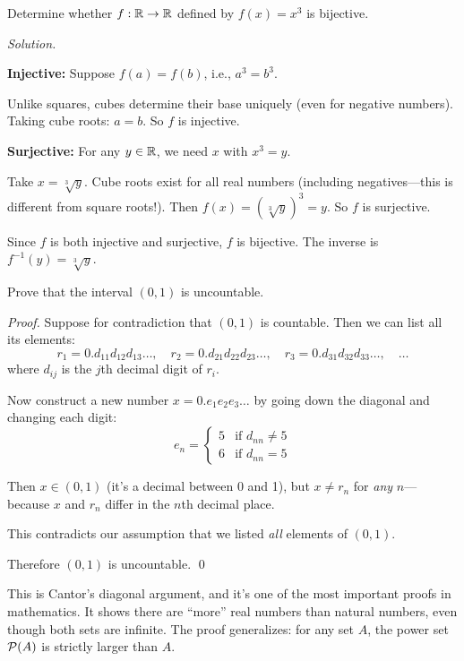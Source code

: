 \begin{example}
Determine whether $f: \mathbb{R} \to \mathbb{R}$ defined by $f(x) = x^3$ is bijective.

\emph{Solution.}

\textbf{Injective:} Suppose $f(a) = f(b)$, i.e., $a^3 = b^3$.

Unlike squares, cubes determine their base uniquely (even for negative numbers). Taking cube roots: $a = b$. So $f$ is injective.

\textbf{Surjective:} For any $y \in \mathbb{R}$, we need $x$ with $x^3 = y$.

Take $x = \sqrt[3]{y}$. Cube roots exist for all real numbers (including negatives---this is different from square roots!). Then $f(x) = (\sqrt[3]{y})^3 = y$. So $f$ is surjective.

Since $f$ is both injective and surjective, $f$ is bijective. The inverse is $f^{-1}(y) = \sqrt[3]{y}$.
\end{example}

\begin{example}
Prove that the interval $(0, 1)$ is uncountable.

\emph{Proof.} Suppose for contradiction that $(0, 1)$ is countable. Then we can list all its elements:
\[
r_1 = 0.d_{11}d_{12}d_{13}\ldots, \quad r_2 = 0.d_{21}d_{22}d_{23}\ldots, \quad r_3 = 0.d_{31}d_{32}d_{33}\ldots, \quad \ldots
\]
where $d_{ij}$ is the $j$th decimal digit of $r_i$.

Now construct a new number $x = 0.e_1e_2e_3\ldots$ by going down the diagonal and changing each digit:
\[
e_n = \begin{cases} 5 & \text{if } d_{nn} \neq 5 \\ 6 & \text{if } d_{nn} = 5 \end{cases}
\]

Then $x \in (0, 1)$ (it's a decimal between 0 and 1), but $x \neq r_n$ for \emph{any} $n$---because $x$ and $r_n$ differ in the $n$th decimal place.

This contradicts our assumption that we listed \emph{all} elements of $(0, 1)$.

Therefore $(0, 1)$ is uncountable. \qed

This is Cantor's diagonal argument, and it's one of the most important proofs in mathematics. It shows there are ``more'' real numbers than natural numbers, even though both sets are infinite. The proof generalizes: for any set $A$, the power set $\mathcal{P}(A)$ is strictly larger than $A$.
\end{example}

